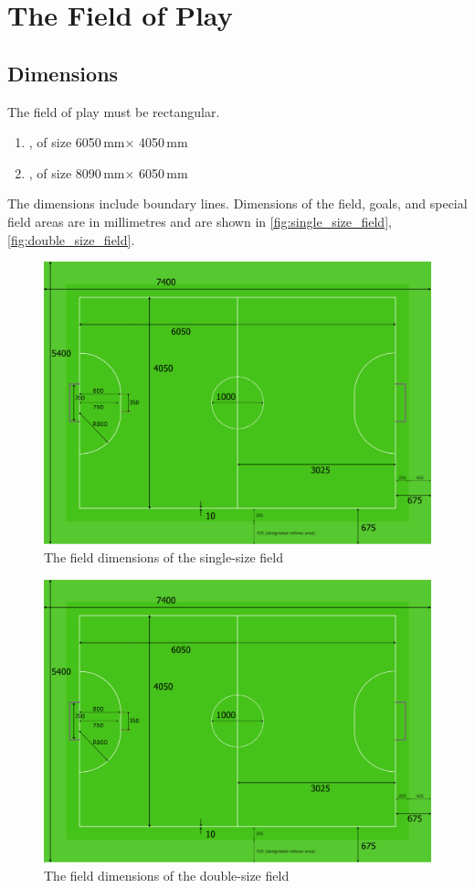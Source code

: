 \section{The Field of Play}\label{sec:field-of-play}

\subsection{Dimensions}
The field of play must be rectangular.
\begin{enumerate}
\item \textbf{}, of size 6050\,mm$\times$ 4050\,mm
\item \textbf{}, of size 8090\,mm$\times$ 6050\,mm
\end{enumerate}
The dimensions include boundary lines.
Dimensions of the field, goals, and special field areas are in millimetres and are shown in \autoref{fig:single_size_field}, \autoref{fig:double_size_field}.

\begin{figure}[ht] %
	\centering
	\includegraphics[width=0.8\columnwidth]{img/field_2012_drawing.png}
	\caption{The field dimensions of the single-size field}
	\label{fig:single_size_field}
\end{figure}

\begin{figure}[ht] %
	\centering
	\includegraphics[width=0.8\columnwidth]{img/field_2012_drawing.png}
	\caption{The field dimensions of the double-size field}
	\label{fig:double_size_field}
\end{figure}

